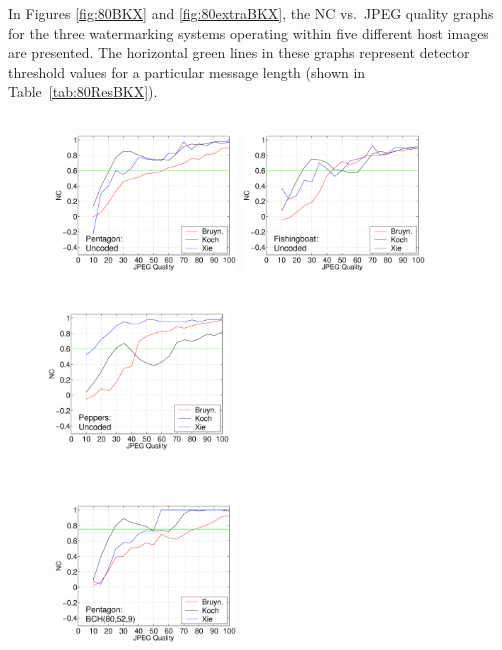 \documentclass[12pt]{report}
\begin{document}
In Figures 
\ref{fig:80BKX} and \ref{fig:80extraBKX}, the NC vs.~JPEG quality graphs for the 
three watermarking systems operating within five different host images are presented. 
The horizontal green lines in these graphs represent detector threshold values for a 
particular message length (shown in Table~\ref{tab:80ResBKX}).

\begin{figure}[p]
\setlength{\abovecaptionskip}{-0.25cm}
\centerline{ \hbox{
        \includegraphics[height=4.6cm,width=4.8cm]{BKX_EPS_formattedBetter/Pentagon80_80_1.eps}
        \includegraphics[height=4.6cm,width=4.8cm]{BKX_EPS_formattedBetter/Fishingboat80_80_1.eps}
        \includegraphics[height=4.6cm,width=4.8cm]{BKX_EPS_formattedBetter/Peppers80_80_1.eps}
}} 
\centerline{ \hbox{
        \includegraphics[height=4.6cm,width=4.8cm]{BKX_EPS_formattedBetter/Pentagon80_52_9.eps}
}}
\end{figure}
\end{document}
